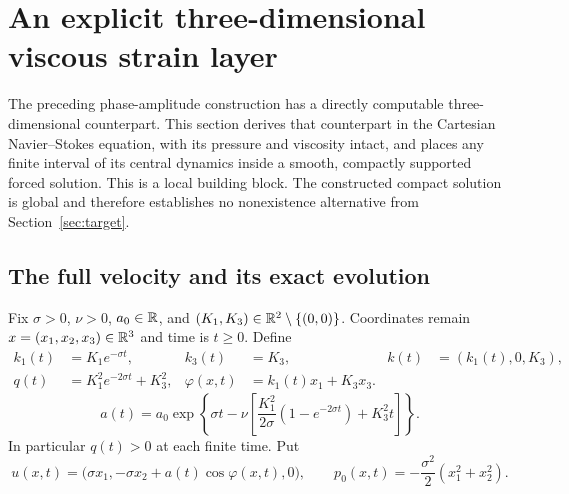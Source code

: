 \section{An explicit three-dimensional viscous strain layer}
\label{sec:viscous-strain}

The preceding phase-amplitude construction has a directly computable
three-dimensional counterpart. This section derives that counterpart in the
Cartesian Navier--Stokes equation, with its pressure and viscosity intact,
and places any finite interval of its central dynamics inside a smooth,
compactly supported forced solution. This is a local building block. The
constructed compact solution is global and therefore establishes no
nonexistence alternative from Section~\ref{sec:target}.

\subsection{The full velocity and its exact evolution}

Fix $\sigma>0$, $\nu>0$, $a_0\in\mathbb R$, and
$(K_1,K_3)\in\mathbb R^2\setminus\{(0,0)\}$. Coordinates remain
$x=(x_1,x_2,x_3)\in\mathbb R^3$ and time is $t\geq0$. Define
\begin{align}
 k_1(t)&=K_1e^{-\sigma t},& k_3(t)&=K_3,&
 k(t)&=(k_1(t),0,K_3),\\
 q(t)&=K_1^2e^{-2\sigma t}+K_3^2,&
 \varphi(x,t)&=k_1(t)x_1+K_3x_3.
\end{align}
\begin{equation}
 a(t)=a_0\exp\left\{\sigma t-
 \nu\left[\frac{K_1^2}{2\sigma}(1-e^{-2\sigma t})+K_3^2t\right]\right\}.
 \label{eq:vs-amplitude}
\end{equation}
In particular $q(t)>0$ at each finite time. Put
\begin{equation}\label{eq:vs-fields}
 u(x,t)=\bigl(\sigma x_1,-\sigma x_2+a(t)\cos\varphi(x,t),0\bigr),
 \qquad p_0(x,t)=-\frac{\sigma^2}{2}(x_1^2+x_2^2).
\end{equation}

